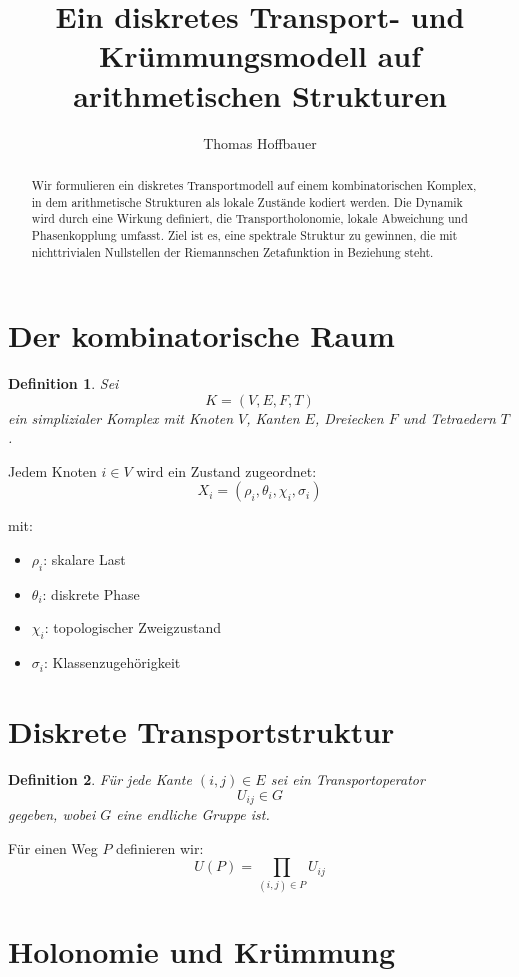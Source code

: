 \documentclass{article}
\title{Ein diskretes Transport- und Krümmungsmodell auf arithmetischen Strukturen}
\author{Thomas Hoffbauer}
\date{}
\newtheorem{definition}{Definition}
\begin{document}
	
	\maketitle
	
	\begin{abstract}
		Wir formulieren ein diskretes Transportmodell auf einem kombinatorischen Komplex, in dem arithmetische Strukturen als lokale Zustände kodiert werden. Die Dynamik wird durch eine Wirkung definiert, die Transportholonomie, lokale Abweichung und Phasenkopplung umfasst. Ziel ist es, eine spektrale Struktur zu gewinnen, die mit nichttrivialen Nullstellen der Riemannschen Zetafunktion in Beziehung steht.
	\end{abstract}
	
	\section{Der kombinatorische Raum}
	
	\begin{definition}
		Sei
		\[
		K = (V,E,F,T)
		\]
		ein simplizialer Komplex mit Knoten $V$, Kanten $E$, Dreiecken $F$ und Tetraedern $T$.
	\end{definition}
	
	Jedem Knoten $i \in V$ wird ein Zustand zugeordnet:
	\[
	X_i = (\rho_i, \theta_i, \chi_i, \sigma_i)
	\]
	
	mit:
	\begin{itemize}
		\item $\rho_i$: skalare Last
		\item $\theta_i$: diskrete Phase
		\item $\chi_i$: topologischer Zweigzustand
		\item $\sigma_i$: Klassenzugehörigkeit
	\end{itemize}
	
	\section{Diskrete Transportstruktur}
	
	\begin{definition}
		Für jede Kante $(i,j) \in E$ sei ein Transportoperator
		\[
		U_{ij} \in G
		\]
		gegeben, wobei $G$ eine endliche Gruppe ist.
	\end{definition}
	
	Für einen Weg $P$ definieren wir:
	\[
	U(P) = \prod_{(i,j)\in P} U_{ij}
	\]
	
	\section{Holonomie und Krümmung}
	
\end{document}
